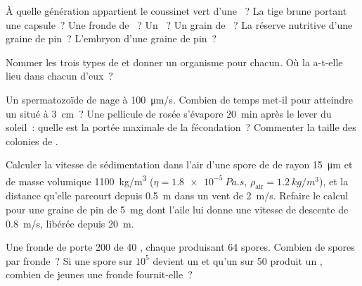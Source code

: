 \begin{exercise}[$\star$]\label{exo:b2:plant-life-cycles:3}
À quelle génération appartient le coussinet vert d'une ~? La tige
brune portant une capsule~? Une fronde de ~? Un ~? Un
grain de ~? La réserve nutritive d'une graine de pin~? L'embryon
d'une graine de pin~?
\end{exercise}

\begin{exercise}[$\star$]\label{exo:b2:plant-life-cycles:4}
Nommer les trois types de  et donner un organisme pour
chacun. Où la  a-t-elle lieu dans chacun d'eux~?
\end{exercise}

\begin{exercise}[$\star\star$]\label{exo:b2:plant-life-cycles:5}
Un spermatozoïde de  nage à \qty{100}{\micro m/s}. Combien de
temps met-il pour atteindre un  situé à \qty{3}{cm}~? Une
pellicule de rosée s'évapore \qty{20}{min} après le lever du soleil~:
quelle est la portée maximale de la fécondation~? Commenter la taille
des colonies de .
\end{exercise}

\begin{exercise}[$\star\star$]\label{exo:b2:plant-life-cycles:6}
Calculer la vitesse de sédimentation dans l'air d'une spore de 
de rayon \qty{15}{\micro m} et de masse volumique \qty{1100}{kg/m^3}
($\eta =
\qty{1.8e-5}{Pa.s}$, $\rho_{\text{air}} = \qty{1.2}{kg/m^3}$), et la
distance qu'elle parcourt depuis \qty{0.5}{m} dans un vent de
\qty{2}{m/s}. Refaire le calcul pour une graine de pin de \qty{5}{mg}
dont l'aile lui donne une vitesse de descente de \qty{0.8}{m/s},
libérée depuis \qty{20}{m}.
\end{exercise}

\begin{exercise}[$\star\star$]\label{exo:b2:plant-life-cycles:7}
Une fronde de  porte \num{200}  de \num{40} ,
chaque  produisant \num{64} spores. Combien de spores par
fronde~? Si une spore sur $10^{5}$ devient un  et qu'un
 sur \num{50} produit un , combien de jeunes
 une fronde fournit-elle~?
\end{exercise}


